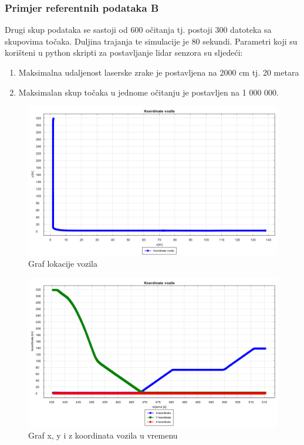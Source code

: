 \subsubsection{Primjer referentnih podataka B}
Drugi skup podataka se sastoji od 600 očitanja tj. postoji 300 datoteka sa skupovima točaka. Duljina trajanja te simulacije je 80 sekundi. Parametri koji su korišteni u python skripti za postavljanje lidar senzora su sljedeći:
\begin{enumerate}
  \item Maksimalna udaljenost laserske zrake je postavljena na 2000 cm tj. 20 metara
  \item Maksimalan skup točaka u jednome očitanju je postavljen na 1 000 000.
\end{enumerate}
\begin{figure}[H]
  \includegraphics[scale=0.35]{images/koordinate2.png}
  \caption{Graf lokacije vozila}
  \label{fig:gt2_lokacija}
\end{figure}
\begin{figure}[H]
  \includegraphics[scale=0.35]{images/koordinate_vrijeme2.png}
  \caption{Graf x, y i z koordinata vozila u vremenu}
  \label{fig:gt2_lokacija_koord}
\end{figure}
